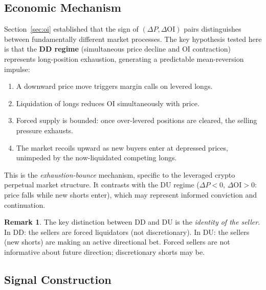 \documentclass[12pt, a4paper]{article}
\theoremstyle{plain}
\theoremstyle{definition}
\newtheorem{remark}{Remark}[section]
\newcommand{\OI}{\mathrm{OI}}
\begin{document}
\subsection{Economic Mechanism}

Section~\ref{sec:oi} established that the sign of $(\Delta P, \Delta\OI)$
pairs distinguishes between fundamentally different market processes.  The
key hypothesis tested here is that the \textbf{DD regime} (simultaneous
price decline and OI contraction) represents long-position exhaustion,
generating a predictable mean-reversion impulse:

\begin{enumerate}
  \item A downward price move triggers margin calls on levered longs.
  \item Liquidation of longs reduces OI simultaneously with price.
  \item Forced supply is bounded: once over-levered positions are
        cleared, the selling pressure exhausts.
  \item The market recoils upward as new buyers enter at depressed prices,
        unimpeded by the now-liquidated competing longs.
\end{enumerate}

This is the \emph{exhaustion-bounce} mechanism, specific to the leveraged
crypto perpetual market structure.  It contrasts with the DU regime
($\Delta P < 0$, $\Delta\OI > 0$: price falls while new shorts enter),
which may represent informed conviction and continuation.

\begin{remark}
  The key distinction between DD and DU is the \emph{identity of the
  seller}.  In DD: the sellers are forced liquidators (not discretionary).
  In DU: the sellers (new shorts) are making an active directional bet.
  Forced sellers are not informative about future direction; discretionary
  shorts may be.
\end{remark}

\subsection{Signal Construction}
\end{document}

